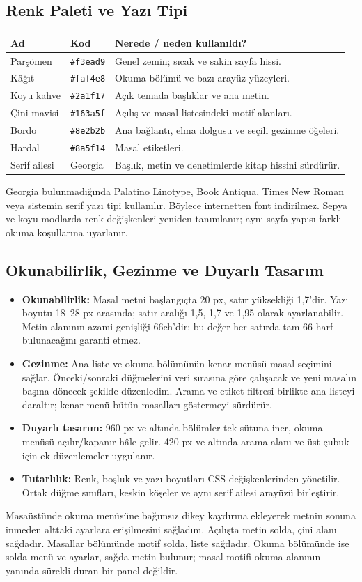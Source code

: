 \documentclass[12pt,a4paper]{article}
\begin{document}
\subsection{Renk Paleti ve Yazı Tipi}
\begin{longtable}{@{}p{2.6cm}p{2.4cm}p{8.7cm}@{}}
\toprule\textbf{Ad} & \textbf{Kod} & \textbf{Nerede / neden kullanıldı?}\\\midrule\endhead
Parşömen & \texttt{\#f3ead9} & Genel zemin; sıcak ve sakin sayfa hissi.\\
Kâğıt & \texttt{\#faf4e8} & Okuma bölümü ve bazı arayüz yüzeyleri.\\
Koyu kahve & \texttt{\#2a1f17} & Açık temada başlıklar ve ana metin.\\
Çini mavisi & \texttt{\#163a5f} & Açılış ve masal listesindeki motif alanları.\\
Bordo & \texttt{\#8e2b2b} & Ana bağlantı, elma dolgusu ve seçili gezinme öğeleri.\\
Hardal & \texttt{\#8a5f14} & Masal etiketleri.\\
Serif ailesi & Georgia & Başlık, metin ve denetimlerde kitap hissini sürdürür.\\
\bottomrule
\end{longtable}
Georgia bulunmadığında Palatino Linotype, Book Antiqua, Times New Roman veya sistemin serif yazı tipi kullanılır. Böylece internetten font indirilmez. Sepya ve koyu modlarda renk değişkenleri yeniden tanımlanır; aynı sayfa yapısı farklı okuma koşullarına uyarlanır.

\subsection{Okunabilirlik, Gezinme ve Duyarlı Tasarım}
\begin{itemize}
\item \textbf{Okunabilirlik:} Masal metni başlangıçta 20 px, satır yüksekliği 1,7'dir. Yazı boyutu 18--28 px arasında; satır aralığı 1,5, 1,7 ve 1,95 olarak ayarlanabilir. Metin alanının azami genişliği 66ch'dir; bu değer her satırda tam 66 harf bulunacağını garanti etmez.
\item \textbf{Gezinme:} Ana liste ve okuma bölümünün kenar menüsü masal seçimini sağlar. Önceki/sonraki düğmelerini veri sırasına göre çalışacak ve yeni masalın başına dönecek şekilde düzenledim. Arama ve etiket filtresi birlikte ana listeyi daraltır; kenar menü bütün masalları göstermeyi sürdürür.
\item \textbf{Duyarlı tasarım:} 960 px ve altında bölümler tek sütuna iner, okuma menüsü açılır/kapanır hâle gelir. 420 px ve altında arama alanı ve üst çubuk için ek düzenlemeler uygulanır.
\item \textbf{Tutarlılık:} Renk, boşluk ve yazı boyutları CSS değişkenlerinden yönetilir. Ortak düğme sınıfları, keskin köşeler ve aynı serif ailesi arayüzü birleştirir.
\end{itemize}
Masaüstünde okuma menüsüne bağımsız dikey kaydırma ekleyerek metnin sonuna inmeden alttaki ayarlara erişilmesini sağladım. Açılışta metin solda, çini alanı sağdadır. Masallar bölümünde motif solda, liste sağdadır. Okuma bölümünde ise solda menü ve ayarlar, sağda metin bulunur; masal motifi okuma alanının yanında sürekli duran bir panel değildir.
\end{document}
